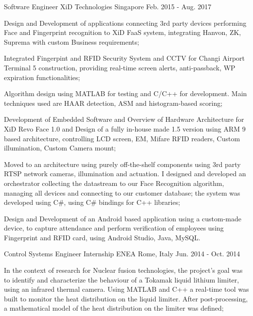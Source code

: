 \begin{cventries}
    \cventry
    {Software Engineer} %
    {XiD Technologies} %
    {Singapore} %
    {Feb. 2015 - Aug. 2017} %
    {
      \begin{cvitems} %
        \item {Design and Development of applications connecting 3rd party devices performing Face and Fingerprint recognition to
        XiD FaaS system, integrating Hanvon, ZK, Suprema with custom Business requirements;}
        \item {Integrated Fingerpint and RFID Security System and CCTV for Changi Airport Terminal 5 construction, providing
        real-time screen alerts, anti-passback, WP expiration functionalities;}
        \item {Algorithm design using MATLAB for testing and C/C++ for development.
        Main techniques used are HAAR detection, ASM and
        histogram-based scoring;}
        \item {Development of Embedded Software and Overview of Hardware Architecture for XiD Revo Face 1.0 and Design of a fully
        in-house made 1.5 version using ARM 9 based architecture, controlling LCD screen, EM, Mifare RFID readers, Custom illumination,
        Custom Camera mount;}
        \item {Moved to an architecture using purely off-the-shelf components using 3rd party RTSP network cameras, illumination and actuation.
        I designed and developed an orchestrator collecting the datastream to our Face Recognition algorithm, managing all devices and connecting to our customer database;
        the system was developed using C\#, using C\# bindings for C++ libraries;}
        \item {Design and Development of an Android based application using a custom-made device, to capture attendance and
        perform verification of employees using Fingerprint and RFID card, using Android Studio, Java, MySQL.}
      \end{cvitems}
    }

    \cventry
    {Control Systems Engineer Internship} %
    {ENEA} %
    {Rome, Italy} %
    {Jun. 2014 - Oct. 2014} %
    {
      \begin{cvitems} %
        \item {In the context of research for Nuclear fusion technologies, the project’s
        goal was to identify and characterize the behaviour
        of a Tokamak liquid lithium limiter, using an infrared thermal
        camera. Using MATLAB and C++ a real-time tool was built to monitor
        the heat distribution on the liquid limiter. After post-processing, a
        mathematical model of the heat distribution on the limiter was defined;}
      \end{cvitems}
    }


\end{cventries}
